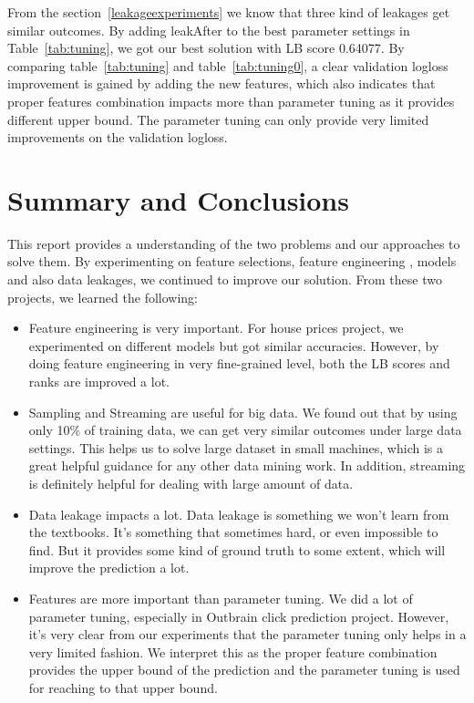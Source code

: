 \documentclass[fleqn,10pt]{SelfArx} %
\begin{document}
From the section~\ref{leakageexperiments} we know that three kind of leakages get similar outcomes. By adding leakAfter to the best parameter settings in Table~\ref{tab:tuning}, we got our best solution with LB score 0.64077. By comparing table~\ref{tab:tuning} and table~\ref{tab:tuning0}, a clear validation logloss improvement is gained by adding the new features, which also indicates that proper features combination impacts more than parameter tuning as it provides different upper bound. The parameter tuning can only provide very limited improvements on the validation logloss.


\section{Summary and Conclusions}\label{conclusion}

This report provides a understanding of the two problems and our approaches to solve them. By experimenting on feature selections, feature engineering , models and also data leakages, we continued to improve our solution. From these two projects, we learned the following:
\begin{itemize}
\item Feature engineering is very important. For house prices project, we experimented on different models but got similar accuracies. However, by doing feature engineering in very fine-grained level, both the LB scores and ranks are improved a lot. 
\item Sampling and Streaming are useful for big data. We found out that by using only 10\% of training data, we can get very similar outcomes under large data settings. This helps us to solve large dataset in small machines, which is a great helpful guidance for any other data mining work. In addition, streaming is definitely helpful for dealing with large amount of data.
\item Data leakage impacts a lot. Data leakage is something we won't learn from the textbooks. It's something that sometimes hard, or even impossible to find. But it provides some kind of ground truth to some extent, which will improve the prediction a lot.
\item Features are more important than parameter tuning. We did a lot of parameter tuning, especially in Outbrain click prediction project. However, it's very clear from our experiments that the parameter tuning only helps in a very limited fashion. We interpret this as the proper feature combination provides the upper bound of the prediction  and the parameter tuning is used for reaching to that upper bound.
\end{itemize}
\end{document}
